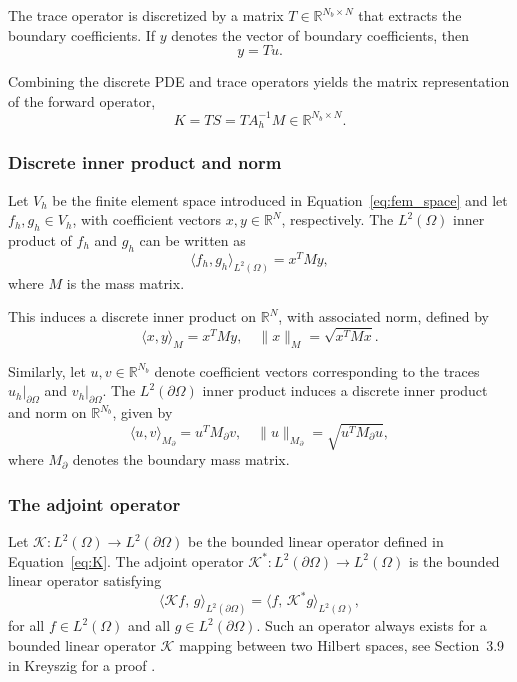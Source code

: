 The trace operator is discretized by a matrix 
$T \in \mathbb{R}^{N_b \times N}$ that extracts the boundary coefficients. If $y$ denotes the vector of boundary coefficients, then
\begin{equation*}
    y = T u.
\end{equation*}

Combining the discrete PDE and trace operators yields the matrix representation of the forward operator,
\begin{equation}\label{eq:discrete_K}
    K = T S = T A_h^{-1} M \in \mathbb{R}^{N_b \times N}.
\end{equation}


\subsubsection{Discrete inner product and norm}
Let $V_h$ be the finite element space introduced in Equation~\eqref{eq:fem_space} and let $f_h, g_h \in V_h$, with coefficient vectors $x, y \in \mathbb{R}^N$, respectively. The $L^2(\Omega)$ inner product of $f_h$ and $g_h$ can be written as
\begin{equation*}
    \langle f_h, g_h \rangle_{L^2(\Omega)} = x^T M y,
\end{equation*}
where $M$ is the mass matrix. 

This induces a discrete inner product on $\mathbb{R}^N$, with associated norm, defined by
\begin{equation}\label{eq:fem_norm}
    \langle x, y \rangle_M = x^T M y,
    \quad
    \| x \|_M = \sqrt{x^T M x}.
\end{equation}

Similarly, let $u, v \in \mathbb{R}^{N_b}$ 
denote coefficient vectors corresponding to the traces 
$u_h|_{\partial\Omega}$ and $v_h|_{\partial\Omega}$. The $L^2(\partial\Omega)$ inner product induces a discrete inner product and norm on $\mathbb{R}^{N_b}$, given by
\begin{equation}\label{eq:fem_norm_ds}
    \langle u, v \rangle_{M_{\partial}}
    = u^T M_{\partial} v,
    \quad
    \| u \|_{M_{\partial}}
    =
    \sqrt{u^T M_{\partial} u},
\end{equation}
where $M_\partial$ denotes the boundary mass matrix.


\subsubsection{The adjoint operator}
Let $\mathcal{K}: L^2(\Omega) \to L^2(\partial\Omega)$ be the bounded linear operator defined in Equation~\eqref{eq:K}. The adjoint operator $\mathcal{K}^*: L^2(\partial\Omega) \to L^2(\Omega)$ is the bounded linear operator satisfying
\begin{equation}\label{eq:K_star_cont}
    \langle \mathcal K f,\, g \rangle_{L^2(\partial\Omega)} =
    \langle f,\, \mathcal K^* g \rangle_{L^2(\Omega)},
\end{equation}
for all $f \in L^2(\Omega)$ and all $g \in L^2(\partial\Omega)$. Such an operator always exists for a bounded linear operator $\mathcal K$ mapping between two Hilbert spaces, see Section~3.9 in Kreyszig for a proof \cite{kreyszigIntroductoryFunctionalAnalysis1989}.

